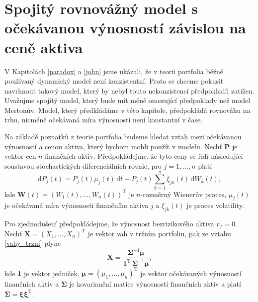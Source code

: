 \documentclass[a4paper,12pt]{report}
\theoremstyle{definition} \newtheorem{definice}[veta]{Definice}
\theoremstyle{remark}
\begin{document}
\section{Spojitý rovnovážný model s očekávanou výnosností závislou na ceně aktiva}\label{muj_model}
V Kapitolách \ref{paradox} a \ref{john} jsme ukázali, že v teorii portfolia běžně používaný dynamický model není konzistentní.
Proto se chceme pokusit navrhnout takový model, který by nebyl touto nekonzistencí předpokladů zatížen.
Uvažujme spojitý model, který bude mít méně omezující předpoklady než model Mertonův.
Model, který předkládáme v této kapitole, předpokládá rovnováhu na trhu, nicméně očekávaná míra výnosnosti není konstantní v čase.

Na základě poznatků z teorie portfolia budeme hledat vztah mezi očekávanou výnosností a cenou aktiva, který bychom mohli použít v modelu.
Nechť $\boldsymbol{P}$ je vektor cen $n$ finančních aktiv.
Předpokládejme, že tyto ceny se řídí následující soustavou stochastických diferenciálních rovnic, pro $j=1,\dots,n$ platí
\begin{equation} \label{SDE}
\mathrm{d}P_j(t)=P_j(t)\mu_j(t)\,\mathrm{d}t+P_j(t)\sum_{k=1}^{n}\xi_{jk}(t)\,\mathrm{d}W_k(t),
\end{equation}
kde $\boldsymbol{W}(t)=(W_1(t),\dots,W_n(t))^\mathrm{T}$ je $n$-rozměrný Wienerův proces, $\mu_j(t)$ je očekávaná míra výnosnosti finančního aktiva $j$ a $\xi_{jk}(t)$ je proces volatility. 

Pro zjednodušení předpokládejme, že výnosnost bezrizikového aktiva $r_f=0$.
Nechť $\boldsymbol{X}=(X_1,\dots,X_n)^\mathrm{T}$ je vektor vah v tržním portfoliu, pak ze vztahu \eqref{vahy_trzni} plyne
\begin{equation} \label{vahy}
\boldsymbol{X}=\frac{\boldsymbol{\Sigma}^{-1}\boldsymbol{\mu}}{\boldsymbol{1}^\mathrm{T}\,\boldsymbol{\Sigma}^{-1}\boldsymbol{\mu}},
\end{equation}
kde $\boldsymbol{1}$ je vektor jedniček, $\boldsymbol{\mu}=(\mu_1,\dots,\mu_n)^\mathrm{T}$ je vektor očekávaných výnosností finančních aktiv a $\boldsymbol{\Sigma}$ je kovarianční matice výnosností finančních aktiv a platí $\boldsymbol{\Sigma}=\boldsymbol{\xi}\boldsymbol{\xi}^\mathrm{T}$.
\end{document}
